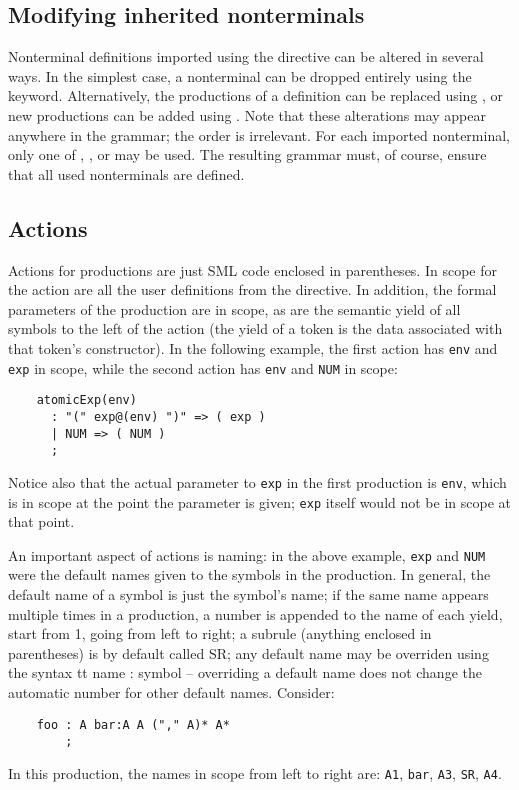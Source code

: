 \subsection{Modifying inherited nonterminals}\label{sec:antlr-inheritence}

Nonterminal definitions imported using the  directive can be altered in several ways.  In the simplest case, a nonterminal can be dropped entirely using the  keyword.  Alternatively, the productions of a definition can be replaced using , or new productions can be added using .  Note that these alterations may appear anywhere in the grammar; the order is irrelevant.  For each imported nonterminal, only one of , , or  may be used.  The resulting grammar must, of course, ensure that all used nonterminals are defined.

\subsection{Actions}\label{sec:antlr-actions}

Actions for productions are just SML code enclosed in parentheses.  In scope for the action are all the user definitions from the  directive.  In addition, the formal parameters of the production are in scope, as are the semantic yield of all symbols to the left of the action (the yield of a token is the data associated with that token's constructor).  In the following example, the first action has {\tt env} and {\tt exp} in scope, while the second action has {\tt env} and {\tt NUM} in scope:
\begin{verbatim}
    atomicExp(env)
      : "(" exp@(env) ")" => ( exp )
      | NUM => ( NUM )
      ;
\end{verbatim}
Notice also that the actual parameter to {\tt exp} in the first production is {\tt env}, which is in scope at the point the parameter is given; {\tt exp} itself would not be in scope at that point.

An important aspect of actions is naming: in the above example, {\tt exp} and {\tt NUM} were the default names given to the symbols in the production.  In general, the default name of a symbol is just the symbol's name; if the same name appears multiple times in a production, a number is appended to the name of each yield, start from 1, going from left to right; a subrule (anything enclosed in parentheses) is by default called SR; any default name may be overriden using the syntax {tt name : symbol} -- overriding a default name does not change the automatic number for other default names.  Consider:
\begin{verbatim}
    foo : A bar:A A ("," A)* A*
        ;
\end{verbatim}
In this production, the names in scope from left to right are: {\tt A1}, {\tt bar}, {\tt A3}, {\tt SR}, {\tt A4}.

